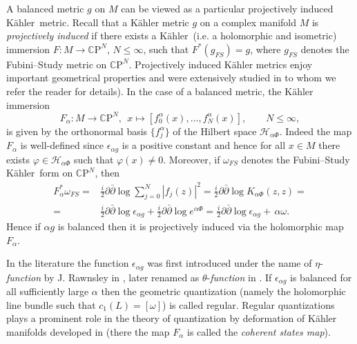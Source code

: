 \documentclass[11pt, reqno]{amsart}
\begin{document}
A balanced metric $g$ on $M$ can be viewed as  a particular  projectively induced  {K\"{a}hler}\ metric.
Recall that a  K\"{a}hler metric $g$ on a complex manifold $M$ is  {\em
projectively induced} if there exists a {K\"{a}hler}\   (i.e. a
holomorphic and isometric) immersion $F\!: M\rightarrow
{\mathbb{C}\mathrm{P}}^N$, $N\leq \infty$, such that $F^*(g_{FS})=g$, where
$g_{FS}$ denotes the Fubini--Study metric on ${\mathbb{C}\mathrm{P}}^N$.
Projectively induced K\"{a}hler metrics enjoy
important geometrical  properties and were extensively  studied in
\cite{ca} to whom we refer the reader for details).
In the case of a balanced metric, the
K\"ahler immersion
$$F_{\alpha}\!: M{\rightarrow} {\mathbb{C}\mathrm{P}}^N,\ \ x\mapsto [f_0^{\alpha}(x), \dots ,f_N^{\alpha}(x)],\quad  \quad N\leq\infty,$$ is given by the  orthonormal basis $\{f_j^{\alpha}\}$ of the Hilbert space ${\mathcal{H}}_{\alpha \Phi}$.
Indeed the map $F_{\alpha}$ is well-defined since $\epsilon_{\alpha g}$ is a positive constant
and hence for all $x\in M$ there exists $\varphi\in {\mathcal{H}}_{\alpha \Phi}$ such that $\varphi(x)\neq 0$. Moreover, if $\omega_{FS}$ denotes the Fubini--Study {K\"{a}hler}\
form on ${\mathbb{C}\mathrm{P}}^N$, then
\begin{equation}\label{balprojind}
\begin{split}
F_{\alpha}^*\omega_{FS}=&\frac{i}{2}{\partial}\bar{\partial}\log\sum_{j=0}^N|f_j(z)|^2
=\frac{i}{2}{\partial}\bar{\partial}\log K_{\alpha \Phi} (z, z)=\\
=&\frac{i}{2}{\partial}\bar{\partial}\log \epsilon_{\alpha g}+\frac{i}{2}{\partial}\bar{\partial}\log e^{\alpha\Phi}
=\frac{i}{2}{\partial}\bar{\partial}\log \epsilon_{\alpha g}+   \,\alpha\omega.
\end{split}
\end{equation}
Hence if $\alpha g$ is balanced then it is projectively induced via the holomorphic  map  $F_{\alpha}$.

In the literature the function $\epsilon_{\alpha g}$ was first introduced under the name of $\eta$-{\em function} by J. Rawnsley in \cite{rawnsley}, later renamed as $\theta$-{\em function} in \cite{CGR}.
 If $\epsilon_{\alpha g}$  is balanced for all sufficiently large
$\alpha$  then the  geometric quantization (namely the holomorphic line bundle such that $c_1(L)=[\omega]$) is called regular. Regular quantizations
plays a prominent role in the theory of quantization by deformation
of K\"{a}hler manifolds developed in \cite{CGR} (there the map  $F_{\alpha}$ is called  the  {\em coherent states map}).
\end{document}
